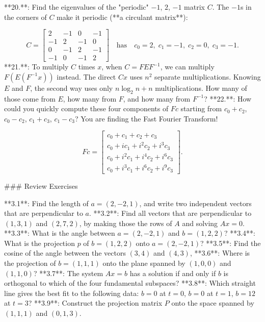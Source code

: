 

**20.**: Find the eigenvalues of the "periodic" \(-1\), \(2\), \(-1\) matrix \(C\). The \(-1\)s in the corners of \(C\) make it periodic (**a circulant matrix**):

\[C=\begin{bmatrix}2&-1&0&-1\\ -1&2&-1&0\\ 0&-1&2&-1\\ -1&0&-1&2\end{bmatrix}\quad\text{has}\quad c_{0}=2,\;c_{1}=-1,\;c_{2}=0,\;c_{3 }=-1.\]
**21.**: To multiply \(C\) times \(x\), when \(C=FEF^{-1}\), we can multiply \(F(E(F^{-1}x))\) instead. The direct \(Cx\) uses \(n^{2}\) separate multiplications. Knowing \(E\) and \(F\), the second way uses only \(n\log_{2}n+n\) multiplications. How many of those come from \(E\), how many from \(F\), and how many from \(F^{-1}\)?
**22.**: How could you quickly compute these four components of \(Fc\) starting from \(c_{0}+c_{2}\), \(c_{0}-c_{2}\), \(c_{1}+c_{3}\), \(c_{1}-c_{3}\)? You are finding the Fast Fourier Transform!

\[Fc=\begin{bmatrix}c_{0}+c_{1}+c_{2}+c_{3}\\ c_{0}+ic_{1}+i^{2}c_{2}+i^{3}c_{3}\\ c_{0}+i^{2}c_{1}+i^{4}c_{2}+i^{6}c_{3}\\ c_{0}+i^{3}c_{1}+i^{6}c_{2}+i^{9}c_{3}\end{bmatrix}.\]

### Review Exercises

**3.1**: Find the length of \(a=(2,-2,1)\), and write two independent vectors that are perpendicular to \(a\).
**3.2**: Find all vectors that are perpendicular to \((1,3,1)\) and \((2,7,2)\), by making those the rows of \(A\) and solving \(Ax=0\).
**3.3**: What is the angle between \(a=(2,-2,1)\) and \(b=(1,2,2)\)?
**3.4**: What is the projection \(p\) of \(b=(1,2,2)\) onto \(a=(2,-2,1)\)?
**3.5**: Find the cosine of the angle between the vectors \((3,4)\) and \((4,3)\),
**3.6**: Where is the projection of \(b=(1,1,1)\) onto the plane spanned by \((1,0,0)\) and \((1,1,0)\)?
**3.7**: The system \(Ax=b\) has a solution if and only if \(b\) is orthogonal to which of the four fundamental subspaces?
**3.8**: Which straight line gives the best fit to the following data: \(b=0\) at \(t=0\), \(b=0\) at \(t=1\), \(b=12\) at \(t=3\)?
**3.9**: Construct the projection matrix \(P\) onto the space spanned by \((1,1,1)\) and \((0,1,3)\).

